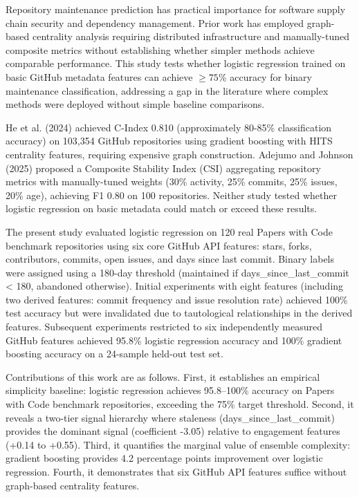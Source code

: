 
Repository maintenance prediction has practical importance for software supply chain security and dependency management. Prior work has employed graph-based centrality analysis requiring distributed infrastructure \citep{he2024repository} and manually-tuned composite metrics \citep{adejumo2025stability} without establishing whether simpler methods achieve comparable performance. This study tests whether logistic regression trained on basic GitHub metadata features can achieve $\geq 75$\% accuracy for binary maintenance classification, addressing a gap in the literature where complex methods were deployed without simple baseline comparisons.

He et al. (2024) achieved C-Index 0.810 (approximately 80-85\% classification accuracy) on 103,354 GitHub repositories using gradient boosting with HITS centrality features, requiring expensive graph construction. Adejumo and Johnson (2025) proposed a Composite Stability Index (CSI) aggregating repository metrics with manually-tuned weights (30\% activity, 25\% commits, 25\% issues, 20\% age), achieving F1 0.80 on 100 repositories. Neither study tested whether logistic regression on basic metadata could match or exceed these results.

The present study evaluated logistic regression on 120 real Papers with Code benchmark repositories using six core GitHub API features: stars, forks, contributors, commits, open issues, and days since last commit. Binary labels were assigned using a 180-day threshold (maintained if days\_since\_last\_commit < 180, abandoned otherwise). Initial experiments with eight features (including two derived features: commit frequency and issue resolution rate) achieved 100\% test accuracy but were invalidated due to tautological relationships in the derived features. Subsequent experiments restricted to six independently measured GitHub features achieved 95.8\% logistic regression accuracy and 100\% gradient boosting accuracy on a 24-sample held-out test set.

Contributions of this work are as follows. First, it establishes an empirical simplicity baseline: logistic regression achieves 95.8--100\% accuracy on Papers with Code benchmark repositories, exceeding the 75\% target threshold. Second, it reveals a two-tier signal hierarchy where staleness (days\_since\_last\_commit) provides the dominant signal (coefficient -3.05) relative to engagement features (+0.14 to +0.55). Third, it quantifies the marginal value of ensemble complexity: gradient boosting provides 4.2 percentage points improvement over logistic regression. Fourth, it demonstrates that six GitHub API features suffice without graph-based centrality features.

